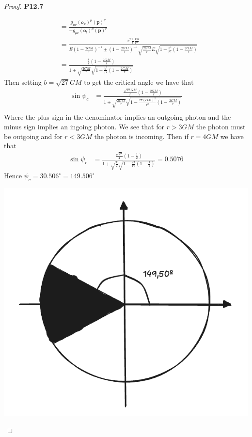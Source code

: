\documentclass[11pt]{article}
\theoremstyle{definition}
\begin{document}
\begin{proof}{\textbf{P12.7}}
\begin{itemize}
\begin{align*}
        &= \frac{g_{\mu\nu}(\bm{o}_x)^\mu (\bm{p})^\nu}
        {-g_{\mu\nu}(\bm{o}_t)^\mu (\bm{p})^\nu}\\
        &= \frac{r^2\frac{1}{r}\frac{Eb}{r^2}}
        {E(1 - \frac{2GM}{r})^{-1} \pm (1 - \frac{2GM}{r})^{-1}
        \sqrt{\frac{2GM}{r}}E\sqrt{1 - \frac{b^2}{r^2}(1 - \frac{2GM}{r})}}\\
        &= \frac{\frac{b}{r}(1 - \frac{2GM}{r})}
        {1 \pm \sqrt{\frac{2GM}{r}}\sqrt{1 - \frac{b^2}{r^2}(1 - \frac{2GM}{r})}}
    \end{align*}
    Then setting $b = \sqrt{27}GM$ to get the critical angle we have that
    \begin{align*}
        \sin\psi_c
        &= \frac{\frac{\sqrt{27}GM}{r}(1 - \frac{2GM}{r})}
        {1 \pm \sqrt{\frac{2GM}{r}}\sqrt{1 - \frac{27(GM)^2}{r^2}(1 - \frac{2GM}{r})}}\\
    \end{align*}
    Where the plus sign in the denominator implies an outgoing photon and the
    minus sign implies an ingoing photon. We see that for $r > 3GM$ the photon
    must be outgoing and for $r < 3GM$ the photon is incoming.
    Then if $r = 4GM$ we have that
    \begin{align*}
        \sin\psi_c
        &= \frac{\frac{\sqrt{27}}{4}(1 - \frac{1}{2})}
        {1 + \sqrt{\frac{1}{2}}\sqrt{1 - \frac{27}{16}(1 - \frac{1}{2})}}
        = 0.5076
    \end{align*}
    Hence $\psi_c = 30.506^\circ = 149.506 ^\circ$
    \begin{center}
        \includegraphics[scale=0.3]{ch12-p12.7-i.png}

\end{center}
\end{itemize}
\end{proof}
\end{document}
